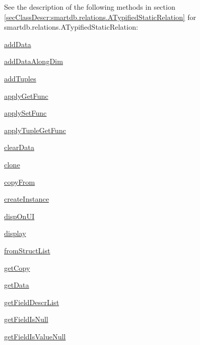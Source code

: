 See the description of the following methods in section \ref{secClassDescr:smartdb.relations.ATypifiedStaticRelation}
 for smartdb.relations.ATypifiedStaticRelation:

\begin{list}{}{}
 \item \hyperref[method:smartdb.relations.ATypifiedStaticRelation.addData]{addData}
 \item \hyperref[method:smartdb.relations.ATypifiedStaticRelation.addDataAlongDim]{addDataAlongDim}
 \item \hyperref[method:smartdb.relations.ATypifiedStaticRelation.addTuples]{addTuples}
 \item \hyperref[method:smartdb.relations.ATypifiedStaticRelation.applyGetFunc]{applyGetFunc}
 \item \hyperref[method:smartdb.relations.ATypifiedStaticRelation.applySetFunc]{applySetFunc}
 \item \hyperref[method:smartdb.relations.ATypifiedStaticRelation.applyTupleGetFunc]{applyTupleGetFunc}
 \item \hyperref[method:smartdb.relations.ATypifiedStaticRelation.clearData]{clearData}
 \item \hyperref[method:smartdb.relations.ATypifiedStaticRelation.clone]{clone}
 \item \hyperref[method:smartdb.relations.ATypifiedStaticRelation.copyFrom]{copyFrom}
 \item \hyperref[method:smartdb.relations.ATypifiedStaticRelation.createInstance]{createInstance}
 \item \hyperref[method:smartdb.relations.ATypifiedStaticRelation.dispOnUI]{dispOnUI}
 \item \hyperref[method:smartdb.relations.ATypifiedStaticRelation.display]{display}
 \item \hyperref[method:smartdb.relations.ATypifiedStaticRelation.fromStructList]{fromStructList}
 \item \hyperref[method:smartdb.relations.ATypifiedStaticRelation.getCopy]{getCopy}
 \item \hyperref[method:smartdb.relations.ATypifiedStaticRelation.getData]{getData}
 \item \hyperref[method:smartdb.relations.ATypifiedStaticRelation.getFieldDescrList]{getFieldDescrList}
 \item \hyperref[method:smartdb.relations.ATypifiedStaticRelation.getFieldIsNull]{getFieldIsNull}
 \item \hyperref[method:smartdb.relations.ATypifiedStaticRelation.getFieldIsValueNull]{getFieldIsValueNull}

\end{list}
